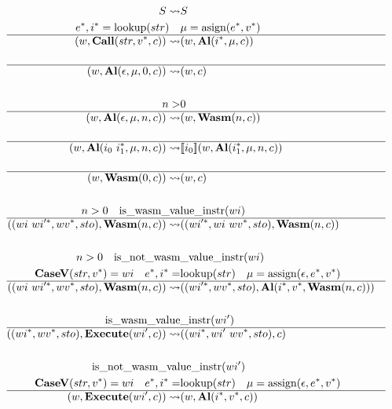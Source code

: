 
\newpage

\begin{align*}
\newline \\
  S \leadsto& S
%
\newline \\
  \seq e, \seq i = \text{lookup}(str) \quad& \mu = \text{asign}(\seq e, \seq v) \\
  \hline
  (w, \call (str, \seq v, c)) \leadsto& (w, \al (\seq i, \mu, c)) \\
%
\newline \\
  \hline
  (w, \al (\epsilon, \mu, 0, c)) \leadsto& (w, c) \\
%
\newline \\
  n >& 0 \\
  \hline
  (w, \al (\epsilon, \mu, n, c)) \leadsto& (w, \wasm (n, c)) \\
%
\newline \\
  \hline
  (w, \al (i_0 ~ \seq{i_1}, \mu, n, c)) \leadsto& \sem{i_0}(w, \al (\seq{i_1}, \mu, n, c)) \\
%
\newline \\
  \hline
  (w, \wasm (0, c)) \leadsto& (w, c) \\
%
\newline \\
  n > 0 \quad \text{is\_wasm\_va}&\text{lue\_instr}(wi) \\
  \hline
  ((wi ~ \seq{wi'}, \seq{wv}, sto), \wasm (n, c))
  \leadsto&
  ((\seq{wi'}, wi ~ \seq{wv}, sto), \wasm (n, c)) \\
%
\newline \\
  n > 0 \quad \text{is\_not\_wasm}&\text{\_value\_instr}(wi) \\
  \casev (str, \seq v) = wi \quad
  \seq e, \seq i =& \text{lookup}(str) \quad
  \mu = \text{assign}(\epsilon, \seq e, \seq v) \\
  \hline
  ((wi ~ \seq{wi'}, \seq{wv}, sto), \wasm (n, c))
  \leadsto&
  ((\seq{wi'}, \seq{wv}, sto), \al (\seq i, \seq v, \wasm (n, c))) \\
%
\newline \\
  \text{is\_wasm\_value}&\text{\_instr}(wi') \\
  \hline
  ((\seq{wi}, \seq{wv}, sto), \exe (wi', c))
  \leadsto&
  ((\seq{wi}, wi' ~ \seq{wv}, sto), c) \\
%
\newline \\
  \text{is\_not\_wasm\_val}&\text{ue\_instr}(wi') \\
  \casev (str, \seq v) = wi \quad
  \seq e, \seq i =& \text{lookup}(str) \quad
  \mu = \text{assign}(\epsilon, \seq e, \seq v) \\
  \hline
  (w, \exe (wi', c)) \leadsto& (w, \al (\seq i, \seq v, c)) \\
\end{align*}
